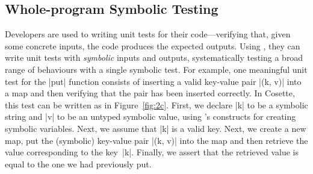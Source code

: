 

\vspace*{-0.2cm}
\subsection{Whole-program Symbolic Testing}
\label{subsec:st}

Developers are used to writing unit tests for their code---verifying that, given some concrete inputs, the code produces the expected outputs. Using \cosette, they can write unit tests with \emph{symbolic} inputs and outputs, systematically testing a broad range of behaviours with a single symbolic test. For example, one meaningful unit test for the \jsinline|put| function consists of inserting a valid key-value pair \jsinline|(k, v)| into a map and then verifying that the pair has been inserted correctly. In Cosette, this test can be written as in Figure~\ref{fig:2c}. First, we declare \jsinline|k| to be a symbolic string and \jsinline|v| to be an untyped symbolic value, using \cosette's constructs for creating symbolic variables. Next, we assume that \jsinline|k| is a valid key. Next, we create a new map, put the (symbolic) key-value pair \jsinline|(k, v)| into the map and then retrieve the value corresponding to the key~\jsinline|k|. Finally, we assert that the retrieved value is equal to the one we had previously put.

